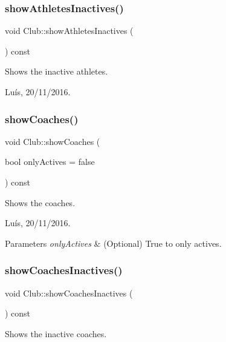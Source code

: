 \subsubsection{\texorpdfstring{show\+Athletes\+Inactives()}{showAthletesInactives()}}
{\footnotesize\ttfamily void Club\+::show\+Athletes\+Inactives (\begin{DoxyParamCaption}{ }\end{DoxyParamCaption}) const}



Shows the inactive athletes. 

Luís, 20/11/2016. \hypertarget{class_club_a4a22977499beaf71a8bb369ac3c91ba1}{}\label{class_club_a4a22977499beaf71a8bb369ac3c91ba1} 
\subsubsection{\texorpdfstring{show\+Coaches()}{showCoaches()}}
{\footnotesize\ttfamily void Club\+::show\+Coaches (\begin{DoxyParamCaption}\item[{bool}]{only\+Actives = {\ttfamily false} }\end{DoxyParamCaption}) const}



Shows the coaches. 

Luís, 20/11/2016. 


\begin{DoxyParams}{Parameters}
{\em only\+Actives} & (Optional) True to only actives. \\
\hline
\end{DoxyParams}
\hypertarget{class_club_a38615db317f0be62839fd65b3a827840}{}\label{class_club_a38615db317f0be62839fd65b3a827840} 
\subsubsection{\texorpdfstring{show\+Coaches\+Inactives()}{showCoachesInactives()}}
{\footnotesize\ttfamily void Club\+::show\+Coaches\+Inactives (\begin{DoxyParamCaption}{ }\end{DoxyParamCaption}) const}



Shows the inactive coaches. 

